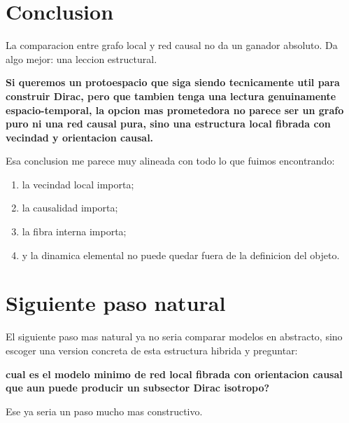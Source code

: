 \section{Conclusion}
La comparacion entre grafo local y red causal no da un ganador absoluto. Da algo mejor: una leccion estructural.

\begin{displayquote}
\textbf{Si queremos un protoespacio que siga siendo tecnicamente util para construir Dirac, pero que tambien tenga una lectura genuinamente espacio-temporal, la opcion mas prometedora no parece ser un grafo puro ni una red causal pura, sino una estructura local fibrada con vecindad y orientacion causal.}
\end{displayquote}

Esa conclusion me parece muy alineada con todo lo que fuimos encontrando:
\begin{enumerate}[label=\arabic*.]
    \item la vecindad local importa;
    \item la causalidad importa;
    \item la fibra interna importa;
    \item y la dinamica elemental no puede quedar fuera de la definicion del objeto.
\end{enumerate}

\section{Siguiente paso natural}
El siguiente paso mas natural ya no seria comparar modelos en abstracto, sino escoger una version concreta de esta estructura hibrida y preguntar:
\begin{displayquote}
\textbf{cual es el modelo minimo de red local fibrada con orientacion causal que aun puede producir un subsector Dirac isotropo?}
\end{displayquote}

Ese ya seria un paso mucho mas constructivo.
